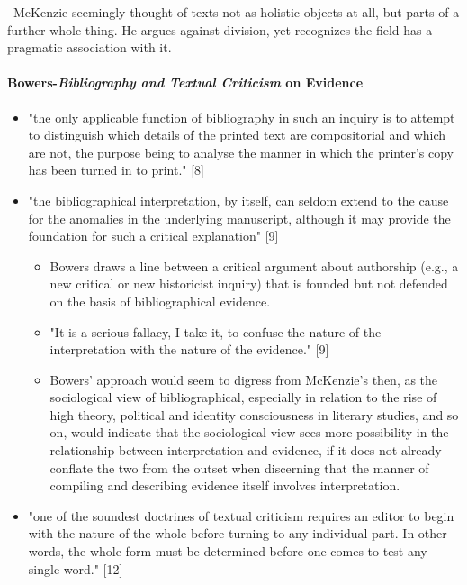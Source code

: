 \documentclass[course, english]{Notes}
\newcommand{\n}{\scalebox{2}{\textbf{\framebox{$\aleph$}}}}
\begin{document}
\n --McKenzie seemingly thought of texts not as holistic objects at all, but parts of a further whole thing. He argues against division, yet recognizes the field has a pragmatic association with it. 



\paragraph {\textbf{Bowers-\emph{Bibliography and Textual Criticism} on Evidence}}
\begin{itemize}
\item {"the only applicable function of bibliography in such an inquiry is to attempt to distinguish which details of the printed text are compositorial and which are not, the purpose being to analyse the manner in which the printer's copy has been turned in to print." [8]}
\item {"the bibliographical interpretation, by itself, can seldom extend to the cause for the anomalies in the underlying manuscript, although it may provide the foundation for such a critical explanation" [9]}
\begin{itemize}
\item{\n Bowers draws a line between a critical argument about authorship (e.g., a new critical or new historicist inquiry) that is founded but not defended on the basis of bibliographical evidence.}
\item {"It is a serious fallacy, I take it, to confuse the nature of the interpretation with the nature of the evidence." [9]}
\item {\n Bowers' approach would seem to digress from McKenzie's then, as the sociological view of bibliographical, especially in relation to the rise of high theory, political and identity consciousness in literary studies, and so on, would indicate that the sociological view sees more possibility in the relationship between interpretation and evidence, if it does not already conflate the two from the outset when discerning that the manner of compiling and describing evidence itself involves interpretation.}
\end{itemize}
\item{"one of the soundest doctrines of textual criticism requires an editor to begin with the nature of the whole before turning to any individual part. In other words, the whole form must be determined before one comes to test any single word." [12]}

\end{itemize}
\end{document}
